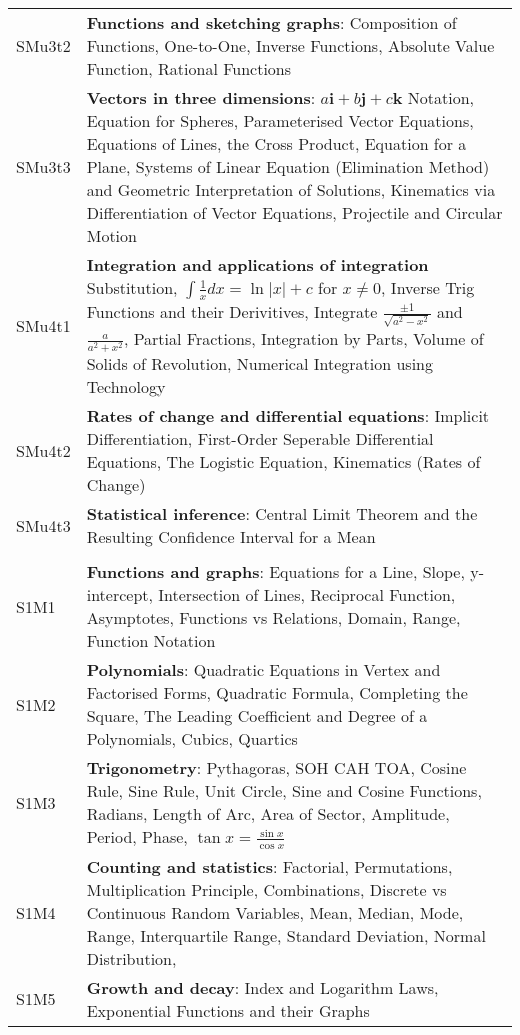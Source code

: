\documentclass[varwidth=144mm, 12pt]{standalone}
\begin{document}
\begin{longtable}{lp{}}
SMu3t2 & \textbf{Functions and sketching graphs}: Composition of Functions, One-to-One, Inverse Functions, Absolute Value Function, Rational Functions \\
SMu3t3 & \textbf{Vectors in three dimensions}: $a\textbf{i} + b\textbf{j} + c\textbf{k}$ Notation, Equation for Spheres, Parameterised Vector Equations, Equations of Lines, the Cross Product, Equation for a Plane, Systems of Linear Equation (Elimination Method) and Geometric Interpretation of Solutions, Kinematics via Differentiation of Vector Equations, Projectile and Circular Motion \\
SMu4t1 & \textbf{Integration and applications of integration} Substitution, $\int \frac{1}{x}dx = \ln{|x|} + c$ for $x \neq 0$, Inverse Trig Functions and their Derivitives, Integrate $\frac{\pm1}{\sqrt{a^2-x^2}}$ and $\frac{a}{a^2 + x^2}$, Partial Fractions, Integration by Parts, Volume of Solids of Revolution, Numerical Integration using Technology \\
SMu4t2 & \textbf{Rates of change and differential equations}: Implicit Differentiation, First-Order Seperable Differential Equations, The Logistic Equation, Kinematics (Rates of Change) \\
SMu4t3 & \textbf{Statistical inference}: Central Limit Theorem and the Resulting Confidence Interval for a Mean \\
& \\
S1M1 & \textbf{Functions and graphs}: Equations for a Line, Slope, y-intercept, Intersection of Lines, Reciprocal Function, Asymptotes, Functions vs Relations, Domain, Range, Function Notation \\
S1M2 & \textbf{Polynomials}: Quadratic Equations in Vertex and Factorised Forms, Quadratic Formula, Completing the Square, The Leading Coefficient and Degree of a Polynomials, Cubics, Quartics\\
S1M3 & \textbf{Trigonometry}: Pythagoras, SOH CAH TOA, Cosine Rule, Sine Rule, Unit Circle, Sine and Cosine Functions, Radians, Length of Arc, Area of Sector, Amplitude, Period, Phase, $\tan{x} = \frac{\sin{x}}{\cos{x}}$ \\
S1M4 & \textbf{Counting and statistics}: Factorial, Permutations, Multiplication Principle, Combinations, Discrete vs Continuous Random Variables, Mean, Median, Mode, Range, Interquartile Range, Standard Deviation, Normal Distribution, \\
S1M5 & \textbf{Growth and decay}: Index and Logarithm Laws, Exponential Functions and their Graphs \\

\end{longtable}
\end{document}
